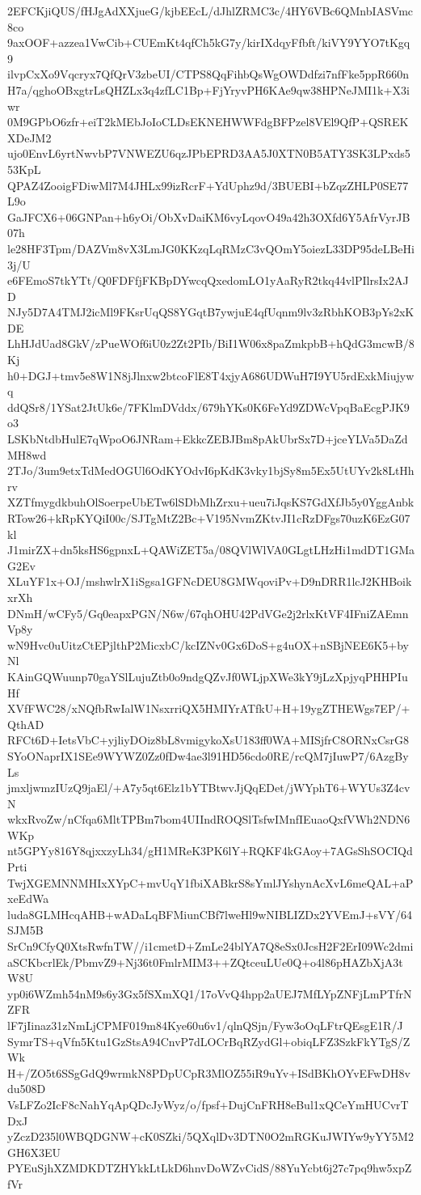 2EFCKjiQUS/fHJgAdXXjueG/kjbEEcL/dJhlZRMC3c/4HY6VBc6QMnbIASVmc8co
9axOOF+azzea1VwCib+CUEmKt4qfCh5kG7y/kirIXdqyFfbft/kiVY9YYO7tKgq9
ilvpCxXo9Vqcryx7QfQrV3zbeUI/CTPS8QqFihbQsWgOWDdfzi7nfFke5ppR660n
H7a/qghoOBxgtrLsQHZLx3q4zfLC1Bp+FjYryvPH6KAe9qw38HPNeJMI1k+X3iwr
0M9GPbO6zfr+eiT2kMEbJoIoCLDsEKNEHWWFdgBFPzel8VEl9QfP+QSREKXDeJM2
ujo0EnvL6yrtNwvbP7VNWEZU6qzJPbEPRD3AA5J0XTN0B5ATY3SK3LPxds553KpL
QPAZ4ZooigFDiwMl7M4JHLx99izRcrF+YdUphz9d/3BUEBI+bZqzZHLP0SE77L9o
GaJFCX6+06GNPan+h6yOi/ObXvDaiKM6vyLqovO49a42h3OXfd6Y5AfrVyrJB07h
le28HF3Tpm/DAZVm8vX3LmJG0KKzqLqRMzC3vQOmY5oiezL33DP95deLBeHi3j/U
e6FEmoS7tkYTt/Q0FDFfjFKBpDYwcqQxedomLO1yAaRyR2tkq44vlPIlrsIx2AJD
NJy5D7A4TMJ2icMl9FKsrUqQS8YGqtB7ywjuE4qfUqnm9lv3zRbhKOB3pYs2xKDE
LhHJdUad8GkV/zPueWOf6iU0z2Zt2PIb/BiI1W06x8paZmkpbB+hQdG3mcwB/8Kj
h0+DGJ+tmv5e8W1N8jJlnxw2btcoFlE8T4xjyA686UDWuH7I9YU5rdExkMiujywq
ddQSr8/1YSat2JtUk6e/7FKlmDVddx/679hYKs0K6FeYd9ZDWcVpqBaEcgPJK9o3
LSKbNtdbHulE7qWpoO6JNRam+EkkcZEBJBm8pAkUbrSx7D+jceYLVa5DaZdMH8wd
2TJo/3um9etxTdMedOGUl6OdKYOdvI6pKdK3vky1bjSy8m5Ex5UtUYv2k8LtHhrv
XZTfmygdkbuhOlSoerpeUbETw6lSDbMhZrxu+ueu7iJqsKS7GdXfJb5y0YggAnbk
RTow26+kRpKYQiI00c/SJTgMtZ2Bc+V195NvmZKtvJI1cRzDFgs70uzK6EzG07kl
J1mirZX+dn5ksHS6gpnxL+QAWiZET5a/08QVlWlVA0GLgtLHzHi1mdDT1GMaG2Ev
XLuYF1x+OJ/mshwlrX1iSgsa1GFNcDEU8GMWqoviPv+D9nDRR1lcJ2KHBoikxrXh
DNmH/wCFy5/Gq0eapxPGN/N6w/67qhOHU42PdVGe2j2rlxKtVF4IFniZAEmnVp8y
wN9Hvc0uUitzCtEPjlthP2MicxbC/kcIZNv0Gx6DoS+g4uOX+nSBjNEE6K5+byNl
KAinGQWuunp70gaYSlLujuZtb0o9ndgQZvJf0WLjpXWe3kY9jLzXpjyqPHHPIuHf
XVfFWC28/xNQfbRwIalW1NsxrriQX5HMIYrATfkU+H+19ygZTHEWgs7EP/+QthAD
RFCt6D+IetsVbC+yjliyDOiz8bL8vmigykoXsU183ff0WA+MISjfrC8ORNxCsrG8
SYoONaprIX1SEe9WYWZ0Zz0fDw4ae3l91HD56cdo0RE/rcQM7jIuwP7/6AzgByLs
jmxljwmzIUzQ9jaEl/+A7y5qt6Elz1bYTBtwvJjQqEDet/jWYphT6+WYUs3Z4cvN
wkxRvoZw/nCfqa6MltTPBm7bom4UIIndROQSlTsfwIMnfIEuaoQxfVWh2NDN6WKp
nt5GPYy816Y8qjxxzyLh34/gH1MReK3PK6lY+RQKF4kGAoy+7AGsShSOCIQdPrti
TwjXGEMNNMHIxXYpC+mvUqY1fbiXABkrS8sYmlJYshynAcXvL6meQAL+aPxeEdWa
luda8GLMHcqAHB+wADaLqBFMiunCBf7lweHl9wNIBLIZDx2YVEmJ+sVY/64SJM5B
SrCn9CfyQ0XtsRwfnTW//i1cmetD+ZmLe24blYA7Q8eSx0JcsH2F2ErI09Wc2dmi
aSCKbcrlEk/PbmvZ9+Nj36t0FmlrMIM3++ZQtceuLUe0Q+o4l86pHAZbXjA3tW8U
yp0i6WZmh54nM9s6y3Gx5fSXmXQ1/17oVvQ4hpp2aUEJ7MfLYpZNFjLmPTfrNZFR
lF7jIinaz31zNmLjCPMF019m84Kye60u6v1/qlnQSjn/Fyw3oOqLFtrQEsgE1R/J
SymrTS+qVfn5Ktu1GzStsA94CnvP7dLOCrBqRZydGl+obiqLFZ3SzkFkYTgS/ZWk
H+/ZO5t6SSgGdQ9wrmkN8PDpUCpR3MlOZ55iR9uYv+ISdBKhOYvEFwDH8vdu508D
VsLFZo2IcF8cNahYqApQDcJyWyz/o/fpsf+DujCnFRH8eBul1xQCeYmHUCvrTDxJ
yZczD235l0WBQDGNW+cK0SZki/5QXqlDv3DTN0O2mRGKuJWIYw9yYY5M2GH6X3EU
PYEuSjhXZMDKDTZHYkkLtLkD6hnvDoWZvCidS/88YuYcbt6j27c7pq9hw5xpZfVr
